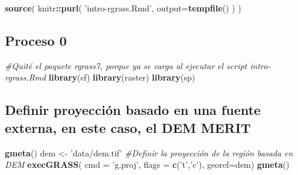 \documentclass[11pt,]{article}
\newenvironment{Shaded}{\begin{snugshade}}{\end{snugshade}}
\newcommand{\KeywordTok}[1]{\textcolor[rgb]{0.13,0.29,0.53}{\textbf{#1}}}
\newcommand{\DataTypeTok}[1]{\textcolor[rgb]{0.13,0.29,0.53}{#1}}
\newcommand{\StringTok}[1]{\textcolor[rgb]{0.31,0.60,0.02}{#1}}
\newcommand{\CommentTok}[1]{\textcolor[rgb]{0.56,0.35,0.01}{\textit{#1}}}
\newcommand{\OtherTok}[1]{\textcolor[rgb]{0.56,0.35,0.01}{#1}}
\newcommand{\OperatorTok}[1]{\textcolor[rgb]{0.81,0.36,0.00}{\textbf{#1}}}
\newcommand{\NormalTok}[1]{#1}
\begin{document}
\begin{Shaded}
\end{Shaded}

\begin{Shaded}
\begin{Highlighting}[]
\KeywordTok{source}\NormalTok{(}
\NormalTok{  knitr}\OperatorTok{::}\KeywordTok{purl}\NormalTok{(}
    \StringTok{'intro-rgrass.Rmd'}\NormalTok{,}
    \DataTypeTok{output=}\KeywordTok{tempfile}\NormalTok{()}
\NormalTok{  )}
\NormalTok{)}
\end{Highlighting}
\end{Shaded}

\subsection{Proceso 0}\label{proceso-0}

\begin{Shaded}
\begin{Highlighting}[]
\CommentTok{#Quité el paquete rgrass7, porque ya se carga al ejecutar el script intro-rgrass.Rmd}
\KeywordTok{library}\NormalTok{(sf)}
\KeywordTok{library}\NormalTok{(raster)}
\KeywordTok{library}\NormalTok{(sp)}
\end{Highlighting}
\end{Shaded}

\subsection{Definir proyección basado en una fuente externa, en este
caso, el DEM
MERIT}\label{definir-proyecciuxf3n-basado-en-una-fuente-externa-en-este-caso-el-dem-merit}

\begin{Shaded}
\begin{Highlighting}[]
\KeywordTok{gmeta}\NormalTok{()}
\NormalTok{dem <-}\StringTok{ 'data/dem.tif'}
\CommentTok{#Definir la proyección de la región basada en DEM}
\KeywordTok{execGRASS}\NormalTok{(}
  \DataTypeTok{cmd =} \StringTok{'g.proj'}\NormalTok{,}
  \DataTypeTok{flags =} \KeywordTok{c}\NormalTok{(}\StringTok{'t'}\NormalTok{,}\StringTok{'c'}\NormalTok{),}
  \DataTypeTok{georef=}\NormalTok{dem)}
\KeywordTok{gmeta}\NormalTok{()}
\end{Highlighting}
\end{Shaded}
\end{document}
